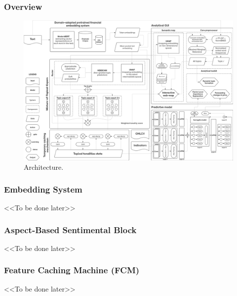 \subsubsection{Overview}

\begin{figure}[H]
    \centering
    \includegraphics[width=1\linewidth]{img/architecture_overview.png}
    \caption{Architecture.}
    \label{fig:architecture_overview}
\end{figure}

\subsubsection{Embedding System}
<<To be done later>>

\subsubsection{Aspect-Based Sentimental Block}
<<To be done later>>

\subsubsection{Feature Caching Machine (FCM)}
<<To be done later>>
